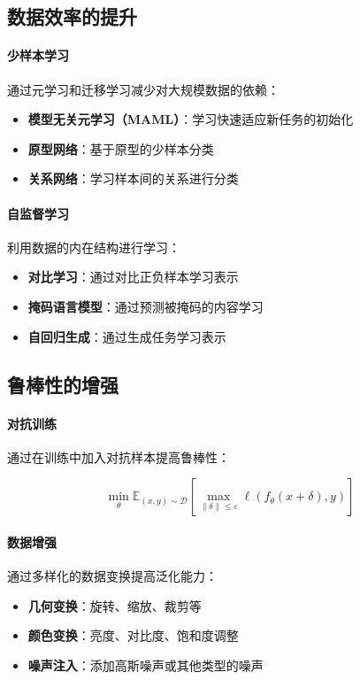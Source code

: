 \subsection{数据效率的提升}

\paragraph{少样本学习}
通过元学习和迁移学习减少对大规模数据的依赖：

\begin{itemize}
\item \textbf{模型无关元学习（MAML）}：学习快速适应新任务的初始化
\item \textbf{原型网络}：基于原型的少样本分类
\item \textbf{关系网络}：学习样本间的关系进行分类
\end{itemize}

\paragraph{自监督学习}
利用数据的内在结构进行学习：

\begin{itemize}
\item \textbf{对比学习}：通过对比正负样本学习表示
\item \textbf{掩码语言模型}：通过预测被掩码的内容学习
\item \textbf{自回归生成}：通过生成任务学习表示
\end{itemize}

\subsection{鲁棒性的增强}

\paragraph{对抗训练}
通过在训练中加入对抗样本提高鲁棒性：

$$\min_\theta \mathbb{E}_{(x,y) \sim \mathcal{D}} \left[ \max_{\|\delta\| \leq \varepsilon} \ell(f_\theta(x + \delta), y) \right]$$

\paragraph{数据增强}
通过多样化的数据变换提高泛化能力：

\begin{itemize}
\item \textbf{几何变换}：旋转、缩放、裁剪等
\item \textbf{颜色变换}：亮度、对比度、饱和度调整
\item \textbf{噪声注入}：添加高斯噪声或其他类型的噪声
\end{itemize}

